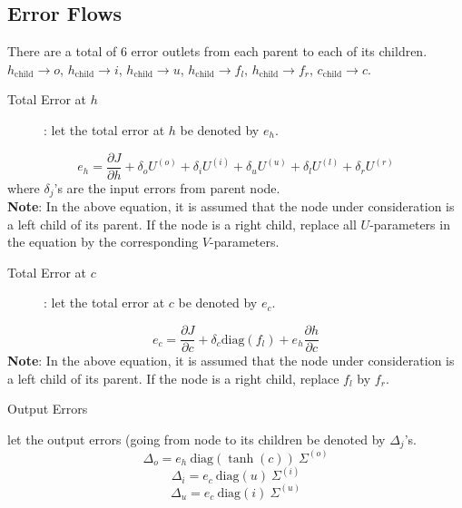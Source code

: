 \documentclass[12pt]{article}
\begin{document}
\subsection{Error Flows}
There are a total of 6 error outlets from each parent to each of its children.
$h_{\text{child}} \rightarrow o$, $h_{\text{child}} \rightarrow i$, $h_{\text{child}} \rightarrow u$, $h_{\text{child}} \rightarrow f_l$, $h_{\text{child}} \rightarrow f_r$, $c_{\text{child}} \rightarrow c$.
\begin{description}
	\item [Total Error at $h$]: let the total error at $h$ be denoted by $e_h$.
\end{description}
\begin{equation}
	e_h = \frac{\partial J}{\partial h} + \delta_o U^{(o)} + \delta_i U^{(i)} + \delta_u U^{(u)} + \delta_l U^{(l)} + \delta_r U^{(r)}
\end{equation}
where $\delta_j$'s are the input errors from parent node. \\
\textbf{Note}: In the above equation, it is assumed that the node under consideration is a left child of its parent. If the node is a right child, replace all $U$-parameters in the equation by the corresponding $V$-parameters.
\begin{description}
	\item [Total Error at $c$]: let the total error at $c$ be denoted by $e_c$.
\end{description}
\begin{equation}
	e_c = \frac{\partial J}{\partial c} + \delta_c \text{diag}(f_l) + e_h \frac{\partial h}{\partial c}
\end{equation}
\textbf{Note}: In the above equation, it is assumed that the node under consideration is a left child of its parent. If the node is a right child, replace $f_l$ by $f_r$.
\begin{description}
	\item [Output Errors]
\end{description}
let the output errors (going from node to its children be denoted by $\Delta_j$'s.
\begin{equation}
	\Delta_o = e_h \:\text{diag}(\tanh(c))\:\Sigma^{(o)}
\end{equation}
\begin{equation}
	\Delta_i = e_c \:\text{diag}(u)\:\Sigma^{(i)}
\end{equation}
\begin{equation}
	\Delta_u = e_c \:\text{diag}(i)\:\Sigma^{(u)}
\end{equation}
\end{document}
